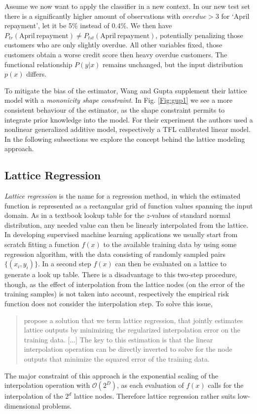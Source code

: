Assume we now want to apply the classifier in a new context. In our new test set there is a significantly higher amount of observations with $overdue > 3$ for `April repayment', let it be 5\% instead of 0.4\%. We then have $P_{tr}(\mathrm{April\ repayment}) \neq P_{tst}(\mathrm{April\ repayment})$, potentially penalizing those customers who are only slightly overdue. All other variables fixed, those customers obtain a worse credit score then heavy overdue customers. The functional relationship $P(y|x)$ remains unchanged, but the input distribution $p(x)$ differs. 

To mitigate the bias of the estimator, Wang and Gupta supplement their lattice model with a \textit{mononicity shape constraint}. In Fig. \ref{Fig:gup1} we see a more consistent behaviour of the estimator, as the shape constraint permits to integrate prior knowledge into the model. For their experiment the authors used a nonlinear generalized additive model, respectively a TFL calibrated linear model. In the following subsections we explore the concept behind the lattice modeling approach.

\subsection{Lattice Regression}

\textit{Lattice regression} is the name for a regression method, in which the estimated function is represented as a rectangular grid of function values spanning the input domain. As in a textbook lookup table for the $z$-values of standard normal distribution, any needed value can then be linearly interpolated from the lattice. In developing supervised machine learning applications we usually start from scratch fitting a function $f(x)$ to the available training data by using some regression algorithm, with the data consisting of randomly sampled pairs $\{(x_i, y_i)\}$. In a second step $f(x)$ can then be evaluated on a lattice to generate a look up table. There is a disadvantage to this two-step procedure, though, as the effect of interpolation from the lattice nodes (on the error of the training samples) is not taken into account, respectively the empirical risk function does not consider the interpolation step. To solve this issue, \citep[pp.~1]{garcia2009lattice} 
\begin{quote}\small
	propose a solution that we term lattice regression, that jointly estimates lattice outputs by minimizing the regularized interpolation error on the training data. [...] The key to this estimation is that the linear interpolation operation can be directly inverted to solve for the node outputs that minimize the squared error of the training data.
\end{quote}
The major constraint of this approach is the exponential scaling of the interpolation operation with $\mathcal{O}(2^D)$, as each evaluation of $f(x)$ calls for the interpolation of the $2^d$ lattice nodes. Therefore lattice regression rather suits low-dimensional problems. 

